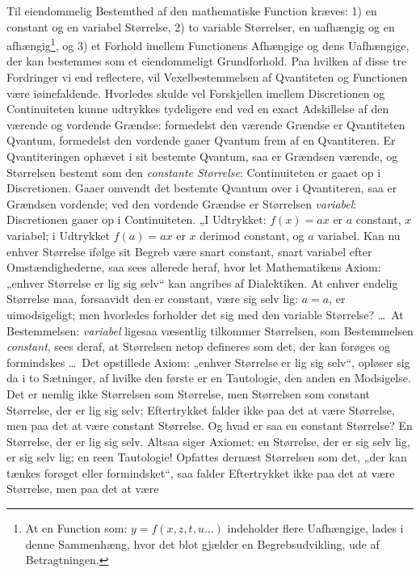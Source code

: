 \documentclass[12pt]{book}
\newcommand{\opage}[1]{\marginnote{\footnotesize\textit{[#1]}}}
\begin{document}
Til eiendommelig Bestemthed af den mathematiske Function kræves: 1) en constant og en variabel
Størrelse, 2) to variable Størrelser, en uafhængig og en afhængig\footnote{At en Function som:
$y = f(x, z, t, u \ldots)$ indeholder flere Uafhængige, lades i denne Sammenhæng, hvor det blot gjælder
en Begrebsudvikling, ude af Betragtningen.}, og 3) et Forhold imellem Functionens Afhængige og dens
Uafhængige, der kan bestemmes som et eiendommeligt Grundforhold. Paa hvilken af disse tre Fordringer vi
end reflectere, vil Vexelbestemmelsen af Qvantiteten og Functionen være iøinefaldende.
\opage{298} Hvorledes skulde vel Forskjellen imellem Discretionen og Continuiteten kunne udtrykkes tydeligere end
ved en exact Adskillelse af den værende og vordende Grændse: formedelst den værende Grændse er
Qvantiteten Qvantum, formedelst den vordende gaaer Qvantum frem af en Qvantiteren. Er Qvantiteringen
ophævet i sit bestemte Qvantum, saa er Grændsen værende, og Størrelsen bestemt som den \emph{constante
Størrelse}: Continuiteten er gaaet op i Discretionen. Gaaer omvendt det bestemte Qvantum over i
Qvantiteren, saa er Grændsen vordende; ved den vordende Grændse er Størrelsen \emph{variabel}:
Discretionen gaaer op i Continuiteten. „I Udtrykket: $f(x) = ax$ er $a$ constant, $x$ variabel; i
Udtrykket $f(a) = ax$ er $x$ derimod constant, og $a$ variabel. Kan nu enhver Størrelse ifølge sit
Begreb være snart constant, snart variabel efter Omstændighederne, saa sees allerede heraf, hvor let
Mathematikens Axiom: „enhver Størrelse er lig sig selv“ kan angribes af Dialektiken. At enhver endelig
Størrelse maa, forsaavidt den er constant, være sig selv lig: $a = a$, er uimodsigeligt; men hvorledes
forholder det sig med den variable Størrelse? \ldots\ At Bestemmelsen: \emph{variabel} ligesaa væsentlig
tilkommer Størrelsen, som Bestemmelsen \emph{constant}, sees deraf, at Størrelsen netop defineres som
det, der kan forøges og formindskes \ldots\ Det opstillede Axiom: „enhver Størrelse er lig sig selv“,
opløser sig da i to Sætninger, af hvilke den første er en Tautologie, den anden en Modsigelse. Det er
nemlig ikke Størrelsen som Størrelse, men Størrelsen som constant Størrelse, der er lig sig selv;
Eftertrykket falder ikke paa det at være Størrelse, men paa det at være constant Størrelse. Og hvad er
saa en constant Størrelse? En Størrelse, der er lig sig selv. Altsaa siger Axiomet: en Størrelse, der er
sig selv lig, er sig selv lig; en reen Tautologie! Opfattes dernæst Størrelsen som det, „der kan tænkes
forøget eller formindsket“, saa falder Eftertrykket ikke paa det at være Størrelse, men paa det at være
\end{document}
